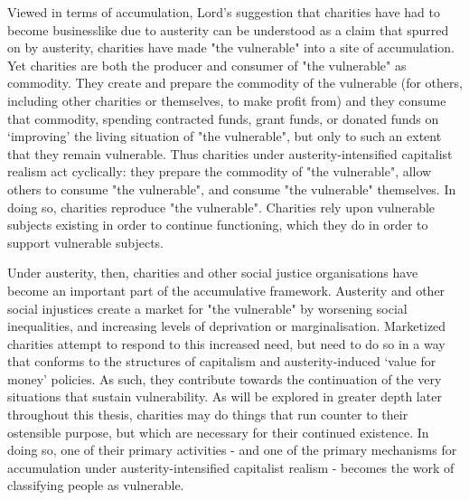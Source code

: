 Viewed in terms of accumulation, Lord's suggestion that charities have had to become businesslike due to austerity can be understood as a claim that spurred on by austerity, charities have made "the vulnerable" into a site of accumulation. Yet charities are both the producer and consumer of "the vulnerable" as commodity. They create and prepare the commodity of the vulnerable (for others, including other charities or themselves, to make profit from) and they consume that commodity, spending contracted funds, grant funds, or donated funds on `improving' the living situation of "the vulnerable", but only to such an extent that they remain vulnerable. Thus charities under austerity-intensified capitalist realism act cyclically: they prepare the commodity of "the vulnerable", allow others to consume "the vulnerable", and consume "the vulnerable" themselves. In doing so, charities reproduce "the vulnerable". Charities rely upon vulnerable subjects existing in order to continue functioning, which they do in order to support vulnerable subjects.

Under austerity, then, charities and other social justice organisations have become an important part of the accumulative framework. Austerity and other social injustices create a market for "the vulnerable" by worsening social inequalities, and increasing levels of deprivation or marginalisation. Marketized charities attempt to respond to this increased need, but need to do so in a way that conforms to the structures of capitalism and austerity-induced `value for money' policies. As such, they contribute towards the continuation of the very situations that sustain vulnerability. As will be explored in greater depth later throughout this thesis, charities may do things that run counter to their ostensible purpose, but which are necessary for their continued existence. In doing so, one of their primary activities - and one of the primary mechanisms for accumulation under austerity-intensified capitalist realism - becomes the work of classifying people as vulnerable.


